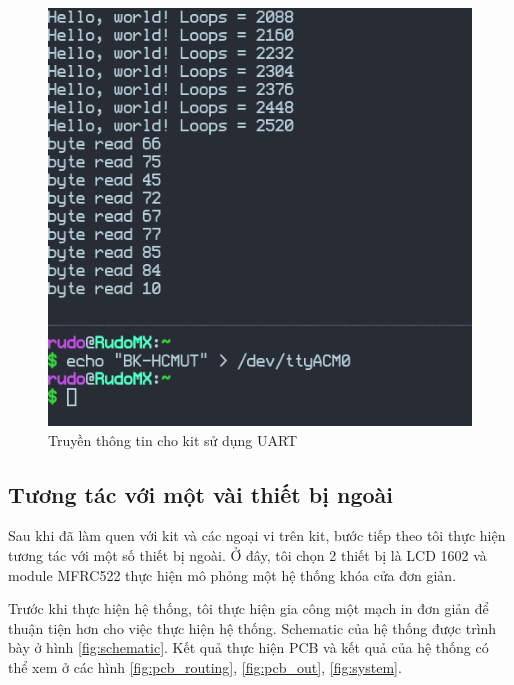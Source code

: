 \begin{figure}[ht]
\centering
\includegraphics[scale=0.5]{images/cycle_uart_read.png}
\caption{Truyền thông tin cho kit sử dụng UART}
\label{fig:cycle_uart_read}
\end{figure}

\clearpage
\subsection{Tương tác với một vài thiết bị ngoài}
Sau khi đã làm quen với kit và các ngoại vi trên kit, bước tiếp theo tôi thực hiện tương tác với một số thiết bị ngoài.
Ở đây, tôi chọn 2 thiết bị là LCD 1602 \cite{lcd_datasheet} và module MFRC522 \cite{mfrc522_datasheet} thực hiện mô phỏng một hệ thống khóa cửa đơn giản.

Trước khi thực hiện hệ thống, tôi thực hiện gia công một mạch in đơn giản để thuận tiện hơn cho việc thực hiện hệ thống.
Schematic của hệ thống được trình bày ở hình \ref{fig:schematic}.
Kết quả thực hiện PCB và kết quả của hệ thống có thể xem ở các hình \ref{fig:pcb_routing}, \ref{fig:pcb_out}, \ref{fig:system}.

